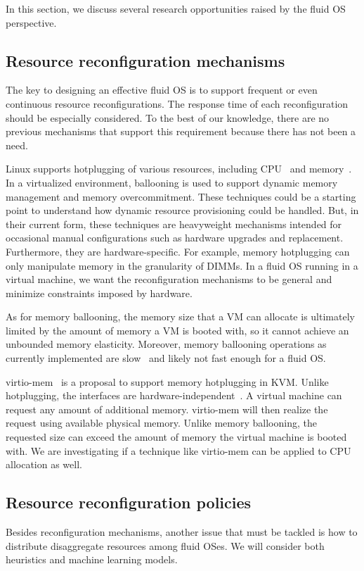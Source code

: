In this section, we discuss several research opportunities raised by
the fluid OS perspective.

\subsection{Resource reconfiguration mechanisms}  The key to
designing an effective fluid OS is to support frequent or even
continuous resource reconfigurations.
The response time of each reconfiguration
should be especially considered.  To the best of our knowledge,
there are no previous mechanisms that support this requirement
because there has not been a need.

Linux supports hotplugging of various resources, including
CPU~\cite{linux_cpu_hotplug} and memory~\cite{linux_memory_hotplug}.
In a virtualized environment, ballooning\cite{waldspurger02} is
used to support dynamic memory management and memory overcommitment.
These techniques could be a starting point to understand how dynamic
resource provisioning could be handled.
But, in their current form, these techniques are heavyweight mechanisms
intended for occasional manual configurations such as hardware
upgrades and replacement. Furthermore, they are hardware-specific.
For example, memory hotplugging can
only manipulate memory in the granularity of DIMMs.
In a fluid OS running in a virtual machine, we want the
reconfiguration mechanisms to be general and minimize
constraints imposed by hardware.

As for memory ballooning, the memory size that a VM can allocate is
ultimately limited by the amount of memory a VM is booted with,
so it cannot achieve an unbounded memory elasticity.
Moreover, memory ballooning operations as currently implemented are
slow~\cite{amit2014vswapper} and likely not fast enough for a fluid OS.

virtio-mem~\cite{virtio-mem} is a proposal to support memory
hotplugging in KVM.  Unlike hotplugging, the
interfaces are hardware-independent~\cite{jones2010virtio}.
A virtual machine can request any amount of additional memory.
virtio-mem will then realize the request using available
physical memory.  Unlike memory ballooning, the requested size
can exceed the amount of memory the virtual machine is booted with.
We are investigating if a technique like virtio-mem can be
applied to CPU allocation as well.

\subsection{Resource reconfiguration policies}
Besides reconfiguration mechanisms, another issue that must be
tackled is how to distribute disaggregate resources among fluid
OSes.  We will consider both heuristics and machine learning models.

